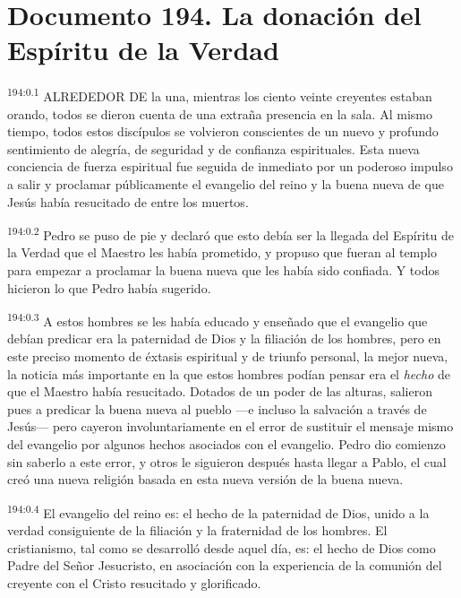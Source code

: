 \chapter{Documento 194. La donación del Espíritu de la Verdad}
\par 
\textsuperscript{194:0.1} ALREDEDOR DE la una, mientras los ciento veinte creyentes estaban orando, todos se dieron cuenta de una extraña presencia en la sala. Al mismo tiempo, todos estos discípulos se volvieron conscientes de un nuevo y profundo sentimiento de alegría, de seguridad y de confianza espirituales. Esta nueva conciencia de fuerza espiritual fue seguida de inmediato por un poderoso impulso a salir y proclamar públicamente el evangelio del reino y la buena nueva de que Jesús había resucitado de entre los muertos.

\par 
\textsuperscript{194:0.2} Pedro se puso de pie y declaró que esto debía ser la llegada del Espíritu de la Verdad que el Maestro les había prometido, y propuso que fueran al templo para empezar a proclamar la buena nueva que les había sido confiada. Y todos hicieron lo que Pedro había sugerido.

\par 
\textsuperscript{194:0.3} A estos hombres se les había educado y enseñado que el evangelio que debían predicar era la paternidad de Dios y la filiación de los hombres, pero en este preciso momento de éxtasis espiritual y de triunfo personal, la mejor nueva, la noticia más importante en la que estos hombres podían pensar era el \textit{hecho} de que el Maestro había resucitado. Dotados de un poder de las alturas, salieron pues a predicar la buena nueva al pueblo ---e incluso la salvación a través de Jesús--- pero cayeron involuntariamente en el error de sustituir el mensaje mismo del evangelio por algunos hechos asociados con el evangelio. Pedro dio comienzo sin saberlo a este error, y otros le siguieron después hasta llegar a Pablo, el cual creó una nueva religión basada en esta nueva versión de la buena nueva.

\par 
\textsuperscript{194:0.4} El evangelio del reino es: el hecho de la paternidad de Dios, unido a la verdad consiguiente de la filiación y la fraternidad de los hombres. El cristianismo, tal como se desarrolló desde aquel día, es: el hecho de Dios como Padre del Señor Jesucristo, en asociación con la experiencia de la comunión del creyente con el Cristo resucitado y glorificado.

